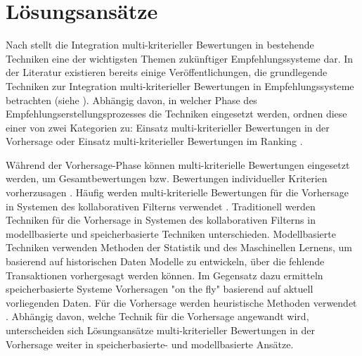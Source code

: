 
\section{Lösungsansätze}
Nach \textcite[S. 853]{adomavicius:4:inbook} stellt die Integration multi-kriteriel\-ler Bewertungen in bestehende Techniken eine der wichtigsten Themen zukünftiger Empfehlungssysteme dar.
In der Literatur existieren bereits einige Veröffentlichungen, die grundlegende Techniken zur Integration multi-kriterieller Bewertungen in Empfehlungssysteme betrachten (siehe \cite{adomavicius:inproceedings:2}\cite{adomavicius:4:inbook}\cite{recommenderSystems:2016}).
Abhängig davon, in welcher Phase des Empfehlungserstellungsprozesses die Techniken eingesetzt werden, ordnen \textcite[S. 854f.]{adomavicius:4:inbook} diese einer von zwei Kategorien zu: Einsatz multi-kriterieller Bewertungen in der Vorhersage oder Einsatz multi-kriterieller Bewertungen im Ranking \cite[S. 854]{adomavicius:4:inbook}.

Während der Vorhersage-Phase können multi-kriterielle Bewertungen eingesetzt werden, um Gesamtbewertungen bzw. Bewertungen individueller Kriterien vorherzusagen \cite[S. 854]{adomavicius:4:inbook}.
Häufig werden multi-kriterielle Bewertungen für die Vorhersage in Systemen des kollaborativen Filterns verwendet \cite[S. 850]{adomavicius:4:inbook}.
Traditionell werden Techniken für die Vorhersage in Systemen des kollaborativen Filterns in modellbasierte und speicherbasierte Techniken unterschieden.
Modellbasierte Techniken verwenden Methoden der Statistik und des Maschinellen Lernens, um basierend auf historischen Daten Modelle zu entwickeln, über die fehlende Transaktionen vorhergesagt werden können.
Im Gegensatz dazu ermitteln speicherbasierte Systeme Vorhersagen "on the fly" \cite[S. 855]{adomavicius:4:inbook} basierend auf aktuell vorliegenden Daten.
Für die Vorhersage werden heuristische Methoden verwendet \cite[S. 855]{adomavicius:4:inbook}.
Abhängig davon, welche Technik für die Vorhersage angewandt wird, unterscheiden sich Lösungsansätze multi-kriterieller Bewertungen in der Vorhersage weiter in speicherbasierte- und modellbasierte Ansätze.

